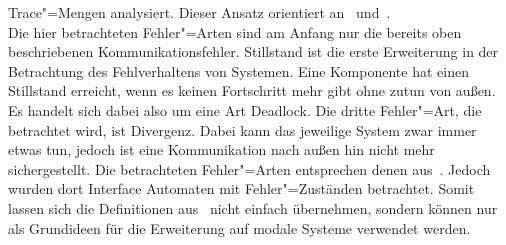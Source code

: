Trace"=Mengen analysiert. Dieser Ansatz orientiert an~\cite{Vogler2014EIO}
und~\cite{Schinko2016BA}.\\
Die hier betrachteten Fehler"=Arten sind am Anfang nur die bereits oben
beschriebenen Kommunikationsfehler. Stillstand ist die erste Erweiterung in der
Betrachtung des Fehlverhaltens von Systemen. Eine Komponente hat einen
Stillstand erreicht, wenn es keinen Fortschritt mehr gibt ohne zutun von außen.
Es handelt sich dabei also um eine Art Deadlock. Die dritte Fehler"=Art, die
betrachtet wird, ist Divergenz. Dabei kann das jeweilige System zwar immer
etwas tun, jedoch ist eine Kommunikation nach außen hin nicht mehr
sichergestellt. Die betrachteten Fehler"=Arten entsprechen denen
aus~\cite{Schinko2016BA}. Jedoch wurden dort Interface Automaten mit
Fehler"=Zuständen betrachtet. Somit lassen sich die Definitionen
aus~\cite{Schinko2016BA} nicht einfach übernehmen, sondern können nur als
Grundideen für die Erweiterung auf modale Systeme verwendet werden.
